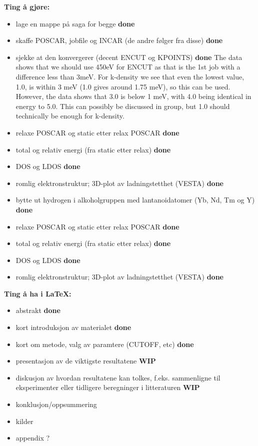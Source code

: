 \documentclass{article}
\begin{document}
\textbf{Ting å gjøre:}
\begin{itemize}
    \item lage en mappe på saga for begge
    \subitem \textbf{done}
    \item skaffe POSCAR, jobfile og INCAR (de andre følger fra disse)
    \subitem \textbf{done}
    \item sjekke at den konvergerer (decent ENCUT og KPOINTS)
    \subitem \textbf{done}
    \subitem The data shows that we should use 450eV for ENCUT as that is the 1st job with a difference less than 3meV.
    \subitem For k-density we see that even the lowest value, 1.0, is within 3 meV (1.0 gives around 1.75 meV), so this can be used. However, the data shows that 3.0 is below 1 meV, with 4.0 being identical in energy to 5.0. This can possibly be discussed in group, but 1.0 should technically be enough for k-density.
    \item relaxe POSCAR og static etter relax POSCAR
    \subitem \textbf{done}
    \item total og relativ energi (fra static etter relax)
    \subitem \textbf{done}
    \item DOS og LDOS
    \subitem \textbf{done}
    \item romlig elektronstruktur; 3D-plot av ladningstetthet (VESTA)
    \subitem \textbf{done}
    \item bytte ut hydrogen i alkoholgruppen med lantanoidatomer (Yb, Nd, Tm og Y)
    \subitem \textbf{done}
    \item relaxe POSCAR og static etter relax POSCAR
    \subitem \textbf{done}
    \item total og relativ energi (fra static etter relax)
    \subitem \textbf{done}
    \item DOS og LDOS
    \subitem \textbf{done}
    \item romlig elektronstruktur; 3D-plot av ladningstetthet (VESTA)
    \subitem \textbf{done}
\end{itemize}

\vspace{1cm}

\textbf{Ting å ha i \LaTeX:}
\begin{itemize}
    \item abstrakt
    \subitem \textbf{done}
    \item kort introduksjon av materialet
    \subitem \textbf{done}
    \item kort om metode, valg av paramtere (CUTOFF, etc)
    \subitem \textbf{done}
    \item presentasjon av de viktigste resultatene
    \subitem \textbf{WIP}
    \item diskusjon av hvordan resultatene kan tolkes, f.eks. sammenligne til eksperimenter eller tidligere beregninger i litteraturen
    \subitem \textbf{WIP}
    \item konklusjon/oppsummering
    \item kilder
    \item appendix ?
\end{itemize}
\end{document}
